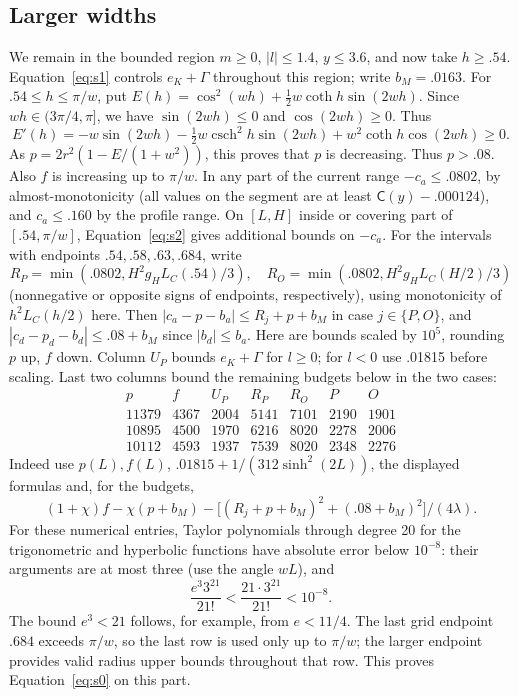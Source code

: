 \subsection{Larger widths}\label{subsec:segments-large}

We remain in the bounded region \(m\ge0\), \(|l|\le1.4\),
\(y\le3.6\), and now take \(h\ge.54\).
Equation~\eqref{eq:s1} controls \(e_K+\Gamma\) throughout this region;
write \(b_M=.0163\). For $.54\le h\le\pi/w$, put
$E(h)=\cos^2(wh)+\tfrac12w\coth h\sin(2wh)$.
Since $wh\in(3\pi/4,\pi]$, we have $\sin(2wh)\le0$ and
$\cos(2wh)\ge0$. Thus
\[
 E'(h)=-w\sin(2wh)-\tfrac12w\operatorname{csch}^2h\sin(2wh)
          +w^2\coth h\cos(2wh)\ge0.
\]
As $p=2r^2(1-E/(1+w^2))$, this proves that $p$ is decreasing. Thus \(p>.08\). Also \(f\) is increasing up to \(\pi/w\). In any part of the current range \(-c_a\le .0802\), by almost-monotonicity (all values on the segment are at least \(\mathsf C(y)-.000124\)), and \(c_a\le .160\) by the profile range. On \([L,H]\) inside or covering part of \([.54,\pi/w]\), Equation~\eqref{eq:s2} gives additional bounds on \(-c_a\). For the intervals with endpoints \(.54,.58,.63,.684\), write
\[
 R_P=\min(.0802, H^2 g_H L_C(.54)/3),\quad R_O=\min(.0802,H^2 g_H L_C(H/2)/3)
\]
(nonnegative or opposite signs of endpoints, respectively), using monotonicity of \(h^2L_C(h/2)\) here. Then \(|c_a-p-b_a|\le R_j+p+b_M\) in case \(j\in\{P,O\}\), and \(|c_d-p_d-b_d|\le .08+b_M\) since \(|b_d|\le b_a\).
Here are bounds scaled by \(10^5\), rounding \(p\) up, \(f\) down. Column \(U_P\) bounds \(e_K+\Gamma\) for \(l\ge0\); for \(l<0\) use .01815 before scaling. Last two columns bound the remaining budgets below in the two cases:
\[
\begin{array}{rrrrrrr}
 p& f&U_P&R_P&R_O& P&O\\\hline
11379&4367&2004&5141&7101&2190&1901\\
10895&4500&1970&6216&8020&2278&2006\\
10112&4593&1937&7539&8020&2348&2276
\end{array}
\]
Indeed use \(p(L),f(L)\), \(.01815+1/(312\sinh^2(2L))\), the displayed formulas and, for the budgets,
\[
 (1+\chi)f-\chi(p+b_M)-\big[(R_j+p+b_M)^2+(.08+b_M)^2\big]/(4\lambda).
\]
For these numerical entries, Taylor polynomials through degree 20
for the trigonometric and hyperbolic functions have absolute error below
$10^{-8}$: their arguments are at most three (use the angle $wL$), and
\[
 \frac{e^3 3^{21}}{21!}<\frac{21\cdot3^{21}}{21!}<10^{-8}.
\]
The bound $e^3<21$ follows, for example, from $e<11/4$.
The last grid endpoint $.684$ exceeds $\pi/w$, so the last row is used
only up to $\pi/w$; the larger endpoint provides valid radius upper
bounds throughout that row. This proves Equation~\eqref{eq:s0} on this part.

